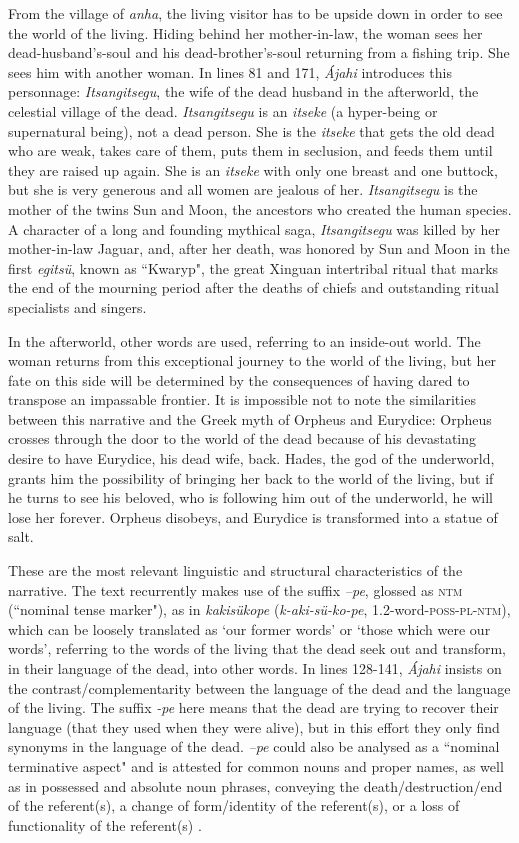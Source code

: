 \documentclass[output=paper,
modfonts,nonflat
]{langsci/langscibook}
\begin{document}
From the village of \emph{anha}, the living visitor has to be upside down in order to see the world of the living. Hiding behind her mother-in-law, the woman sees her dead-husband's-soul and his dead-brother's-soul returning from a fishing trip. She sees him with another woman. In lines 81 and 171, \emph{Ájahi} introduces this personnage: \emph{Itsangitsegu}, the wife of the dead husband in the afterworld, the celestial village of the dead. \emph{Itsangitsegu} is an \emph{itseke} (a hyper-being or supernatural being), not a dead person. She is the \emph{itseke} that gets the old dead who are weak, takes care of them, puts them in seclusion, and feeds them until they are raised up again. She is an \emph{itseke} with only one breast and one buttock, but she is very generous and all women are jealous of her. \emph{Itsangitsegu} is the mother of the twins Sun and Moon, the ancestors who created the human species. A character of a long and founding mythical saga, \emph{Itsangitsegu} was killed by her mother-in-law Jaguar, and, after her death, was honored by Sun and Moon in the first \emph{egitsü}, known as “Kwaryp", the great Xinguan intertribal ritual that marks the end of the mourning period after the deaths of chiefs and outstanding ritual specialists and singers.

In the afterworld, other words are used, referring to an inside-out world. The woman returns from this exceptional journey to the world of the living, but her fate on this side will be determined by the consequences of having dared to transpose an impassable frontier. It is impossible not to note the similarities between this narrative and the Greek myth of Orpheus and Eurydice: Orpheus crosses through the door to the world of the dead because of his devastating desire to have Eurydice, his dead wife, back. Hades, the god of the underworld, grants him the possibility of bringing her back to the world of the living, but if he turns to see his beloved, who is following him out of the underworld, he will lose her forever. Orpheus disobeys, and Eurydice is transformed into a statue of salt.
	
    These are the most relevant linguistic and structural characteristics of the narrative.	The text recurrently makes use of the suffix \emph{–pe}, glossed as \textsc{ntm} (“nominal tense marker"), as in \emph{kakisükope} (\emph{k-aki-sü-ko-pe}, 1.2-word-\textsc{poss-pl-ntm}), which can be loosely translated as ‘our former words’ or ‘those which were our words’, referring to the words of the living that the dead seek out and transform, in their language of the dead, into other words. In lines 128-141, \emph{Ájahi} insists on the contrast/complementarity between the language of the dead and the language of the living. The suffix \emph{-pe} here means that the dead are trying to recover their language (that they used when they were alive), but in this effort they only find synonyms in the language of the dead.  \emph{–pe} could also be analysed as a “nominal terminative aspect" and is attested for common nouns and proper names, as well as in possessed and absolute noun phrases, conveying the death/destruction/end of the referent(s), a change of form/identity of the referent(s), or a loss of functionality of the referent(s) \citep{FranchettoSantos2009,FranchettoThomas2016}.
\end{document}
